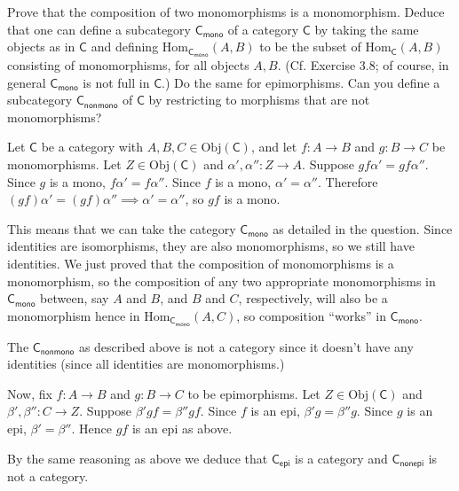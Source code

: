 \documentclass[12pt,letterpaper,boxed]{hmcpset}
\newcommand{\Obj}{\mathrm{Obj}}
\newcommand{\Hom}{\mathrm{Hom}}
\begin{document}
\begin{problem}[4.4]
	Prove that the composition of two monomorphisms is a monomorphism. Deduce that
	one can define a subcategory $\mathsf{C}_\mathsf{mono}$ of a category $\mathsf{C}$ by taking the same
	objects as in $\mathsf{C}$ and defining $\Hom_{\mathsf{C}_\mathsf{mono}}(A, B)$ to be the subset of
	$\Hom_\mathsf{C}(A, B)$ consisting of monomorphisms, for all objects $A, B$. (Cf.
	Exercise 3.8; of course, in general $\mathsf{C}_\mathsf{mono}$ is not full in $\mathsf{C}$.) Do the same
	for epimorphisms. Can you define a subcategory $\mathsf{C}_\mathsf{nonmono}$ of $\mathsf{C}$ by
	restricting to morphisms that are not monomorphisms?
\end{problem}
\begin{solution}
	Let $\mathsf{C}$ be a category with $A,B,C\in \Obj(\mathsf{C})$, and let $f:A\to B$ and $g:B\to
	C$ be monomorphisms. Let $Z\in\Obj(\mathsf{C})$ and $\alpha',\alpha'':Z\to A$. Suppose
	$gf\alpha'=gf\alpha''$. Since $g$ is a mono, $f\alpha'=f\alpha''$. Since $f$ is
	a mono, $\alpha'=\alpha''$. Therefore $(gf)\alpha'=(gf)\alpha'' \implies
	\alpha'=\alpha''$, so $gf$ is a mono.
	
	This means that we can take the category $\mathsf{C}_\mathsf{mono}$ as detailed in the question.
	Since identities are isomorphisms, they are also monomorphisms, so we still have
	identities. We just proved that the composition of monomorphisms is a
	monomorphism, so the composition of any two appropriate monomorphisms in
	$\mathsf{C}_\mathsf{mono}$ between, say $A$ and $B$, and $B$ and $C$, respectively, will also be
	a monomorphism hence in $\Hom_{\mathsf{C}_\mathsf{mono}}(A,C)$, so composition ``works'' in
	$\mathsf{C}_\mathsf{mono}$.
	
	The $\mathsf{C}_\mathsf{nonmono}$ as described above is not a category since it doesn't have any
	identities (since all identities are monomorphisms.)
	
	Now, fix $f:A\to B$ and $g:B\to C$ to be epimorphisms. Let $Z\in\Obj(\mathsf{C})$ and
	$\beta',\beta'':C\to Z$. Suppose $\beta'gf=\beta''gf$. Since $f$ is an epi,
	$\beta'g=\beta''g$. Since $g$ is an epi, $\beta'=\beta''$. Hence $gf$ is an epi
	as above.
	
	By the same reasoning as above we deduce that $\mathsf{C}_\mathsf{epi}$ is a category and
	$\mathsf{C}_\mathsf{nonepi}$ is not a category.
\end{solution}
\end{document}
